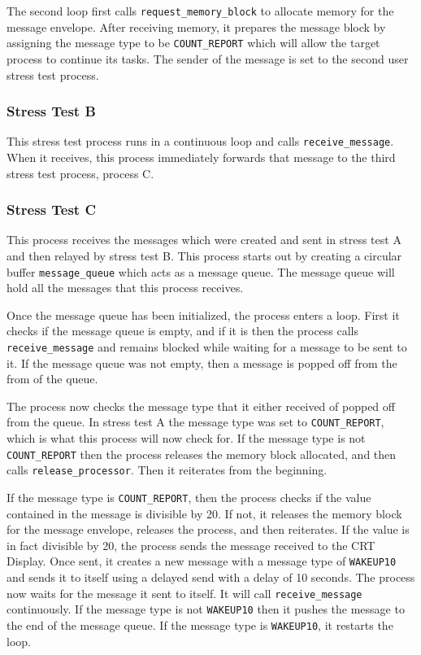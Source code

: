 \documentclass[se]{uw-wkrpt}
\begin{document}
The second loop first calls \texttt{request\_memory\_block} to allocate memory for the message envelope. After receiving memory, it prepares the message block by assigning the message type to be \texttt{COUNT\_REPORT} which will allow the target process to continue its tasks. The sender of the message is set to the second user stress test process.


\subsubsection{Stress Test B}

This stress test process runs in a continuous loop and calls \texttt{receive\_message}. When it receives, this process immediately forwards that message to the third stress test process, process C.


\subsubsection{Stress Test C}

This process receives the messages which were created and sent in stress test A and then relayed by stress test B. This process starts out by creating a circular buffer \texttt{message\_queue} which acts as a message queue. The message queue will hold all the messages that this process receives.

Once the message queue has been initialized, the process enters a loop. First it checks if the message queue is empty, and if it is then the process calls \texttt{receive\_message} and remains blocked while waiting for a message to be sent to it. If the message queue was not empty, then a message is popped off from the from of the queue.

The process now checks the message type that it either received of popped off from the queue. In stress test A the message type was set to \texttt{COUNT\_REPORT}, which is what this process will now check for. If the message type is not \texttt{COUNT\_REPORT} then the process releases the memory block allocated, and then calls \texttt{release\_processor}. Then it reiterates from the beginning.

If the message type is \texttt{COUNT\_REPORT}, then the process checks if the value contained in the message is divisible by 20. If not, it releases the memory block for the message envelope, releases the process, and then reiterates. If the value is in fact divisible by 20, the process sends the message received to the CRT Display. Once sent, it creates a new message with a message type of \texttt{WAKEUP10} and sends it to itself using a delayed send with a delay of 10 seconds. The process now waits for the message it sent to itself. It will call \texttt{receive\_message} continuously. If the message type is not \texttt{WAKEUP10} then it pushes the message to the end of the message queue. If the message type is \texttt{WAKEUP10}, it restarts the loop.
\end{document}
